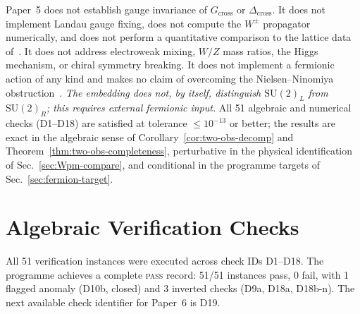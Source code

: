 \documentclass[12pt]{article}
\numberwithin{equation}{section}
\theoremstyle{plain}
\theoremstyle{definition}
\theoremstyle{remark}
\newcommand{\su}{\mathrm{SU}}              %
\newcommand{\Gcross}{G_{\mathrm{cross}}}   %
\newcommand{\Dcross}{\Delta_{\mathrm{cross}}}  %
\begin{document}
	Paper~5 does not establish gauge invariance of $\Gcross$ or
	$\Dcross$.  It does not implement Landau gauge fixing, does not
	compute the $W^{\pm}$ propagator numerically, and does not perform a
	quantitative comparison to the lattice data
	of~\cite{CucchieriMendes2008,Bogolubsky}.  It does not address
	electroweak mixing, $W/Z$ mass ratios, the Higgs mechanism, or
	chiral symmetry breaking.  It does not implement a fermionic action
	of any kind and makes no claim of overcoming the Nielsen--Ninomiya
	obstruction~\cite{NielsenNinomiya1981a,NielsenNinomiya1981b}.
	\emph{The embedding does not, by itself, distinguish $\su(2)_L$ from
		$\su(2)_R$; this requires external fermionic input.}
	All 51 algebraic and numerical checks (D1--D18) are satisfied at
	tolerance $\leq 10^{-13}$ or better; the results are exact in the
	algebraic sense of Corollary~\ref{cor:two-obs-decomp} and
	Theorem~\ref{thm:two-obs-completeness}, perturbative in the physical
	identification of Sec.~\ref{sec:Wpm-compare}, and conditional in the
	programme targets of Sec.~\ref{sec:fermion-target}.
	
	\appendix
	\renewcommand{\thetable}{\Alph{section}.\arabic{table}}
	\renewcommand{\theequation}{\Alph{section}.\arabic{equation}}
	
	\section{Algebraic Verification Checks}
	\label{app:A}
	
	\setcounter{table}{-1}   %
		
		All 51 verification instances were executed across check IDs
		D1--D18.  The programme achieves a complete \textsc{pass} record:
		51/51 instances pass, 0 fail, with 1 flagged anomaly (D10b, closed)
		and 3 inverted checks (D9a, D18a, D18b-n).  The next available check
		identifier for Paper~6 is D19.
		
\end{document}
